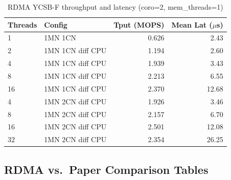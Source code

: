 \documentclass[conference]{IEEEtran}
\begin{document}
\begin{table}[H]
\centering
\caption{RDMA YCSB-F throughput and latency (coro=2, mem\_threads=1)}
\label{tab:rdma-ycsbf}
\scriptsize
\begin{tabular}{@{}llrr@{}}
\toprule
\textbf{Threads} & \textbf{Config} & \textbf{Tput (MOPS)} & \textbf{Mean Lat ($\mu$s)} \\
\midrule
1  & 1MN 1CN             & 0.626 & 2.43 \\
2  & 1MN 1CN diff CPU    & 1.194 & 2.60 \\
4  & 1MN 1CN diff CPU    & 1.939 & 3.43 \\
8  & 1MN 1CN diff CPU    & 2.213 & 6.55 \\
16 & 1MN 1CN diff CPU    & 2.370 & 12.68 \\
\midrule
4  & 1MN 2CN diff CPU    & 1.926 & 3.46 \\
8  & 1MN 2CN diff CPU    & 2.157 & 6.70 \\
16 & 1MN 2CN diff CPU    & 2.501 & 12.08 \\
32 & 1MN 2CN diff CPU    & 2.354 & 26.25 \\
\bottomrule
\end{tabular}
\end{table}

\subsection*{RDMA vs.\ Paper Comparison Tables}

\begin{table}[H]
\centering
\caption{Paper Figure~9 peak throughput vs.\ our RDMA reproduction (per shard, MOPS)}
\label{tab:paper-fig9}
\scriptsize
{}
\end{table}
\end{document}
